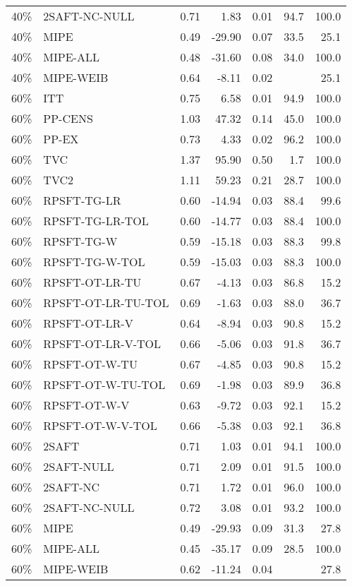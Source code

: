 \begin{table}[ht]
{\begin{tabular}{llrrrrr}
  40\% & 2SAFT-NC-NULL & 0.71 & 1.83 & 0.01 & 94.7 & 100.0 \\ 
  40\% & MIPE & 0.49 & -29.90 & 0.07 & 33.5 & 25.1 \\ 
  40\% & MIPE-ALL & 0.48 & -31.60 & 0.08 & 34.0 & 100.0 \\ 
  40\% & MIPE-WEIB & 0.64 & -8.11 & 0.02 &  & 25.1 \\ 
   \hline
60\% & ITT & 0.75 & 6.58 & 0.01 & 94.9 & 100.0 \\ 
  60\% & PP-CENS & 1.03 & 47.32 & 0.14 & 45.0 & 100.0 \\ 
  60\% & PP-EX & 0.73 & 4.33 & 0.02 & 96.2 & 100.0 \\ 
  60\% & TVC & 1.37 & 95.90 & 0.50 & 1.7 & 100.0 \\ 
  60\% & TVC2 & 1.11 & 59.23 & 0.21 & 28.7 & 100.0 \\ 
   \hline
60\% & RPSFT-TG-LR & 0.60 & -14.94 & 0.03 & 88.4 & 99.6 \\ 
  60\% & RPSFT-TG-LR-TOL & 0.60 & -14.77 & 0.03 & 88.4 & 100.0 \\ 
  60\% & RPSFT-TG-W & 0.59 & -15.18 & 0.03 & 88.3 & 99.8 \\ 
  60\% & RPSFT-TG-W-TOL & 0.59 & -15.03 & 0.03 & 88.3 & 100.0 \\ 
  60\% & RPSFT-OT-LR-TU & 0.67 & -4.13 & 0.03 & 86.8 & 15.2 \\ 
  60\% & RPSFT-OT-LR-TU-TOL & 0.69 & -1.63 & 0.03 & 88.0 & 36.7 \\ 
  60\% & RPSFT-OT-LR-V & 0.64 & -8.94 & 0.03 & 90.8 & 15.2 \\ 
  60\% & RPSFT-OT-LR-V-TOL & 0.66 & -5.06 & 0.03 & 91.8 & 36.7 \\ 
   \hline
60\% & RPSFT-OT-W-TU & 0.67 & -4.85 & 0.03 & 90.8 & 15.2 \\ 
  60\% & RPSFT-OT-W-TU-TOL & 0.69 & -1.98 & 0.03 & 89.9 & 36.8 \\ 
  60\% & RPSFT-OT-W-V & 0.63 & -9.72 & 0.03 & 92.1 & 15.2 \\ 
  60\% & RPSFT-OT-W-V-TOL & 0.66 & -5.38 & 0.03 & 92.1 & 36.8 \\ 
   \hline
60\% & 2SAFT & 0.71 & 1.03 & 0.01 & 94.1 & 100.0 \\ 
  60\% & 2SAFT-NULL & 0.71 & 2.09 & 0.01 & 91.5 & 100.0 \\ 
  60\% & 2SAFT-NC & 0.71 & 1.72 & 0.01 & 96.0 & 100.0 \\ 
  60\% & 2SAFT-NC-NULL & 0.72 & 3.08 & 0.01 & 93.2 & 100.0 \\ 
  60\% & MIPE & 0.49 & -29.93 & 0.09 & 31.3 & 27.8 \\ 
  60\% & MIPE-ALL & 0.45 & -35.17 & 0.09 & 28.5 & 100.0 \\ 
  60\% & MIPE-WEIB & 0.62 & -11.24 & 0.04 &  & 27.8 \\ 
   \hline
\end{tabular}
}
\end{table}
\clearpage
